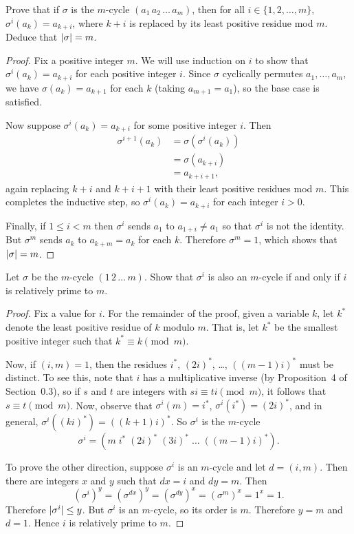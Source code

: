  Prove that if $\sigma$ is the $m$-cycle
$(a_1\,a_2\,\dots\,a_m)$, then for all $i\in\{1,2,\dots,m\}$,
$\sigma^i(a_k) = a_{k+i}$, where $k+i$ is replaced by its least
positive residue mod $m$. Deduce that $\lvert{\sigma}\rvert = m$.
\begin{proof}
  Fix a positive integer $m$. We will use induction on $i$ to show
  that $\sigma^i(a_k) = a_{k+i}$ for each positive integer $i$. Since
  $\sigma$ cyclically permutes $a_1,\dots,a_m$, we have
  $\sigma(a_k) = a_{k+1}$ for each $k$ (taking $a_{m+1} = a_1$), so
  the base case is satisfied.

  Now suppose $\sigma^i(a_k) = a_{k+i}$ for some positive integer
  $i$. Then
  \begin{align*}
    \sigma^{i+1}(a_k) &= \sigma(\sigma^i(a_k)) \\
                      &= \sigma(a_{k+i}) \\
                      &= a_{k+i+1},
  \end{align*}
  again replacing $k+i$ and $k+i+1$ with their least positive residues
  mod $m$. This completes the inductive step, so
  $\sigma^i(a_k) = a_{k+i}$ for each integer $i > 0$.

  Finally, if $1\leq i<m$ then $\sigma^i$ sends $a_1$ to
  $a_{1+i}\neq a_1$ so that $\sigma^i$ is not the identity. But
  $\sigma^m$ sends $a_k$ to $a_{k+m} = a_k$ for each $k$. Therefore
  $\sigma^m = 1$, which shows that $\lvert{\sigma}\rvert = m$.
\end{proof}

 Let $\sigma$ be the $m$-cycle $(1\,2\,\dots\,m)$. Show
that $\sigma^i$ is also an $m$-cycle if and only if $i$ is relatively
prime to $m$.
\label{exercise-m-cycle-power}
\begin{proof}
  Fix a value for $i$. For the remainder of the proof, given a
  variable $k$, let $k^*$ denote the least positive residue of $k$
  modulo $m$. That is, let $k^*$ be the smallest positive integer such
  that $k^*\equiv k\pmod m$.

  Now, if $(i,m) = 1$, then the residues $i^*$, $(2i)^*$, \dots,
  $((m-1)i)^*$ must be distinct. To see this, note that $i$ has a
  multiplicative inverse (by Proposition~4 of Section~0.3), so if $s$
  and $t$ are integers with $si\equiv ti\pmod m$, it follows that
  $s\equiv t\pmod m$. Now, observe that $\sigma^i(m) = i^*$,
  $\sigma^i(i^*) = (2i)^*$, and in general,
  $\sigma^i((ki)^*) = ((k+1)i)^*$. So $\sigma^i$ is the $m$-cycle
  \begin{equation*}
    \sigma^i = (m\;i^*\;(2i)^*\;(3i)^*\;\dots\;((m-1)i)^*).
  \end{equation*}

  To prove the other direction, suppose $\sigma^i$ is an $m$-cycle and
  let $d = (i, m)$. Then there are integers $x$ and $y$ such that
  $dx = i$ and $dy = m$. Then
  \begin{equation*}
    (\sigma^i)^y = (\sigma^{dx})^y
    = (\sigma^{dy})^x = (\sigma^m)^x = 1^x = 1.
  \end{equation*}
  Therefore $\lvert{\sigma^i}\rvert \leq y$. But $\sigma^i$ is an $m$-cycle,
  so its order is $m$. Therefore $y = m$ and $d = 1$. Hence $i$ is
  relatively prime to $m$.
\end{proof}

